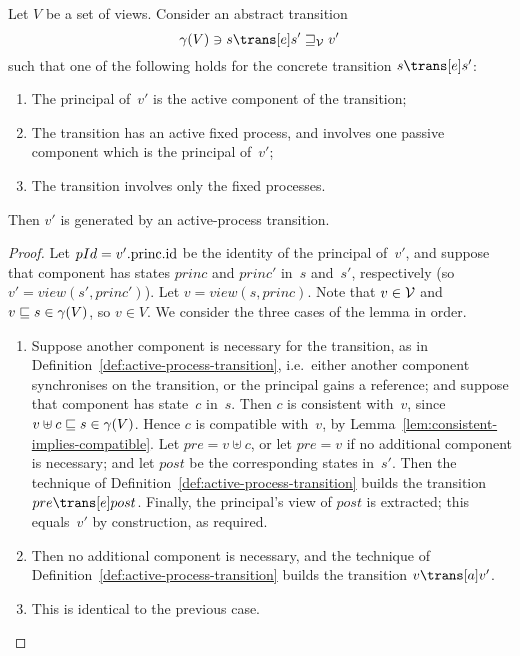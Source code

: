 
\begin{lemma}
\label{lem:active-process-transitions}
Let $V$ be a set of views.  Consider an abstract transition
\[
\gamma(V) \ni s \trans[e] s' \sqge_{\V} v'
\]
such that one of the following holds for the concrete transition $s \trans[e]
s'$:
\begin{enumerate}
\item The principal of~$v'$ is the active component of the transition;

\item The transition has an active fixed process, and involves one passive
  component which is the principal of~$v'$;

\item The transition involves only the fixed processes.
\end{enumerate}
%
Then $v'$ is generated by an active-process transition.
\end{lemma}


\begin{proof}
Let $pId = v'.\mathrm{princ}.\mathrm{id}$ be the identity of the principal of~$v'$, and
suppose that component has states $princ$ and $princ'$ in~$s$ and~$s'$,
respectively (so $v' = view(s', princ')$). Let $v = view(s, princ)$.  Note
that $v \in \mathcal{V}$ and $v \sqsubseteq s \in \gamma(V)$, so $v \in V$.  We consider the
three cases of the lemma in order.
%
\begin{enumerate}
\item
Suppose another component is necessary for the transition, as in
Definition~\ref{def:active-process-transition}, i.e.~either another component
synchronises on the transition, or the principal gains a reference; and
suppose that component has state~$c$ in~$s$.  Then $c$ is consistent
with~$v$, since $v \uplus c \sqsubseteq s \in \gamma(V)$.  Hence $c$ is compatible
with~$v$, by Lemma~\ref{lem:consistent-implies-compatible}. 
%
Let $pre = v \uplus c$, or let $pre = v$ if no additional component is
necessary; and let $post$ be the corresponding states in~$s'$.  Then the
technique of Definition~\ref{def:active-process-transition} builds the
transition \( pre \trans[e] post \).  Finally, the principal's view of $post$
is extracted; this equals~$v'$ by construction, as required. 

\item Then no additional component is necessary, and the technique of
  Definition~\ref{def:active-process-transition} builds the transition $v
  \trans[a] v'$.

\item This is identical to the previous case.
\end{enumerate}
\end{proof}


